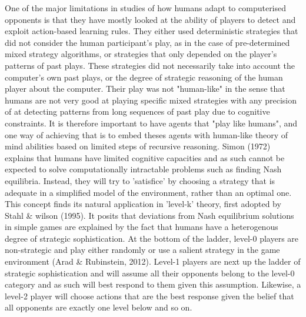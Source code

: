 \documentclass[12pt]{article}         %
\begin{document}
One of the major limitations in studies of how humans adapt to computerised opponents is that they have mostly looked at the ability of players to detect and exploit action-based learning rules. They either used deterministic strategies that did not consider the human participant's play, as in the case of pre-determined mixed strategy algorithms, or strategies that only depended on the player's patterns of past plays. These strategies did not necessarily take into account the computer's own past plays, or the degree of strategic reasoning of the human player about the computer. Their play was not "human-like" in the sense that humans are not very good at playing specific mixed strategies with any precision of at detecting patterns from long sequences of past play due to cognitive constraints. It is therefore important to have agents that "play like humans", and one way of achieving that is to embed theses agents with human-like theory of mind abilities based on limited steps of recursive reasoning. Simon (1972) explains that humans have limited cognitive capacities and as such cannot be expected to solve computationally intractable problems such as finding Nash equilibria. Instead, they will try to 'satisfice' by choosing a strategy that is adequate in a simplified model of the environment, rather than an optimal one. This concept finds its natural application in 'level-k' theory, first adopted by Stahl & wilson (1995). It posits that deviations from Nash equilibrium solutions in simple games are explained by the fact that humans have a heterogenous degree of strategic sophistication. At the bottom of the ladder, level-0 players are non-strategic and play either randomly or use a salient strategy in the game environment (Arad & Rubinstein, 2012). Level-1 players are next up the ladder of strategic sophistication and will assume all their opponents belong to the level-0 category and as such will best respond to them given this assumption. Likewise, a level-2 player will choose actions that are the best response given the belief that all opponents are exactly one level below and so on. 
\end{document}

